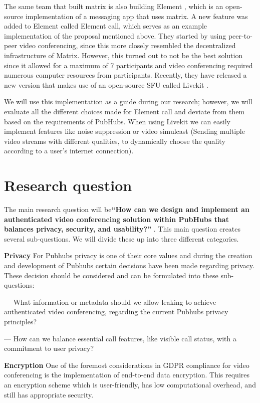 \documentclass[11pt,a4paper]{article}
\begin{document}
    The same team that built matrix is also building Element \cite{ELEMENT}
    , which is an open-source implementation of a messaging app that uses matrix. A new feature was added to Element
    called Element call, which serves as an example implementation of the proposal mentioned above. They started by
    using peer-to-peer video conferencing, since this more closely resembled the decentralized infrastructure of Matrix.
    However, this turned out to not be the best solution since it allowed for a maximum of 7 participants and video
    conferencing required numerous computer resources from participants. Recently, they have released a new version that
    makes use of an open-source SFU called Livekit \cite{LIVEKIT}.

    We will use this implementation as a guide during our research; however, we will evaluate all the different choices
    made for Element call and deviate from them based on the requirements of PubHubs. When using Livekit we can easily
    implement features like noise suppression or video simulcast (Sending multiple video streams with different
    qualities, to dynamically choose the quality according to a user's internet connection).

    \newpage


    \section{Research question}
    The main research question will be\textbf
    {“How can we design and implement an authenticated video conferencing solution within PubHubs that balances privacy,
        security, and usability?”}
    . This main question creates several sub-questions. We will divide these up into three different categories.

    \textbf{Privacy}
    For Pubhubs privacy is one of their core values and during the creation and development of Pubhubs certain decisions
    have been made regarding privacy. These decision should be considered and can be formulated into these
    sub-questions:

    — What information or metadata should we allow leaking to achieve authenticated video conferencing, regarding the
    current Pubhubs privacy principles?

    — How can we balance essential call features, like visible call status, with a commitment to user privacy?

    \textbf{Encryption}
    One of the foremost considerations in GDPR compliance for video conferencing is the implementation of end-to-end
    data encryption. This requires an encryption scheme which is user-friendly, has low computational overhead, and
    still has appropriate security.
\end{document}
